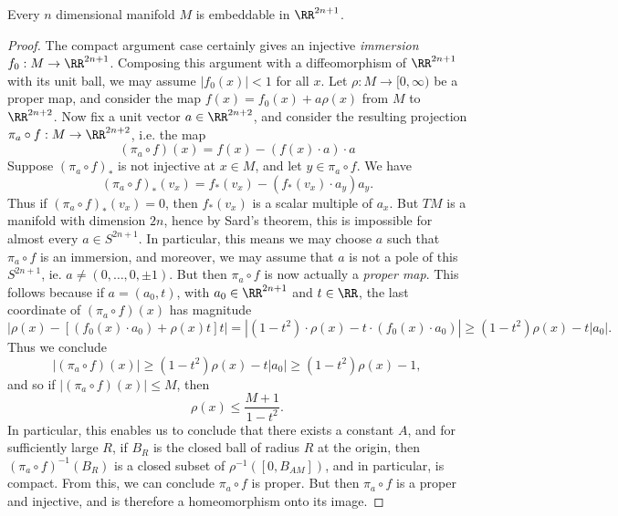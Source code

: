 \begin{theorem}
    Every $n$ dimensional manifold $M$ is embeddable in $\RR^{2n+1}$.
\end{theorem}
\begin{proof}
    The compact argument case certainly gives an injective \emph{immersion} $f_0:M \to \RR^{2n+1}$. Composing this argument with a diffeomorphism of $\RR^{2n+1}$ with its unit ball, we may assume $|f_0(x)| < 1$ for all $x$. Let $\rho: M \to [0,\infty)$ be a proper map, and consider the map $f(x) = f_0(x) + a \rho(x)$ from $M$ to $\RR^{2n+2}$. Now fix a unit vector $a \in \RR^{2n+2}$, and consider the resulting projection $\pi_a \circ f: M \to \RR^{2n+2}$, i.e. the map
    \[ (\pi_a \circ f)(x) = f(x) - (f(x) \cdot a) \cdot a \]
    Suppose $(\pi_a \circ f)_*$ is not injective at $x \in M$, and let $y \in \pi_a \circ f$. We have
    \[ (\pi_a \circ f)_*(v_x) = f_*(v_x) - (f_*(v_x) \cdot a_y) a_y. \]
    Thus if $(\pi_a \circ f)_*(v_x) = 0$, then $f_*(v_x)$ is a scalar multiple of $a_x$. But $TM$ is a manifold with dimension $2n$, hence by Sard's theorem, this is impossible for almost every $a \in S^{2n+1}$. In particular, this means we may choose $a$ such that $\pi_a \circ f$ is an immersion, and moreover, we may assume that $a$ is not a pole of this $S^{2n+1}$, ie. $a \neq (0,\dots,0,\pm 1)$. But then $\pi_a \circ f$ is now actually a \emph{proper map}. This follows because if $a = (a_0,t)$, with $a_0 \in \RR^{2n+1}$ and $t \in \RR$, the last coordinate of $(\pi_a \circ f)(x)$ has magnitude
    \[ |\rho(x) - [(f_0(x) \cdot a_0) + \rho(x) t] t| = |(1 - t^2) \cdot \rho(x) - t \cdot (f_0(x) \cdot a_0)| \geq (1 - t^2) \rho(x) - t |a_0|. \]
    Thus we conclude
    \[ |(\pi_a \circ f)(x)| \geq (1 - t^2) \rho(x) - t |a_0| \geq (1 - t^2) \rho(x) - 1, \]
    and so if $|(\pi_a \circ f)(x)| \leq M$, then
    \[ \rho(x) \leq \frac{M + 1}{1 - t^2}. \]
    In particular, this enables us to conclude that there exists a constant $A$, and for sufficiently large $R$, if $B_R$ is the closed ball of radius $R$ at the origin, then $(\pi_a \circ f)^{-1}(B_R)$ is a closed subset of $\rho^{-1}([0,B_{AM}])$, and in particular, is compact. From this, we can conclude $\pi_a \circ f$ is proper. But then $\pi_a \circ f$ is a proper and injective, and is therefore a homeomorphism onto its image.
\end{proof}

